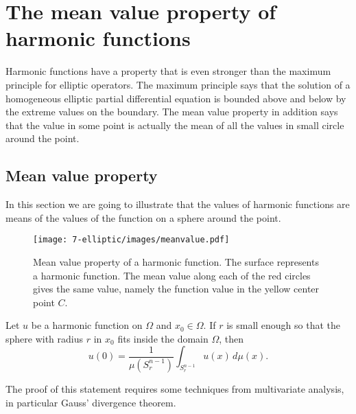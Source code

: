 %
%
%
\section{The mean value property of harmonic functions}
Harmonic functions have a property that is even stronger than
the maximum principle for elliptic operators.
The maximum principle says that the solution of a homogeneous elliptic
partial differential equation is bounded above and below by the
extreme values on the boundary.
The mean value property in addition says that the value in some
point is actually the mean of all the values in small circle
around the point.

\subsection{Mean value property}
In this section we are going to illustrate that the values of harmonic
functions are means of the values of the function on a sphere around 
the point.
\begin{figure}
\centering
\texttt{[image: 7-elliptic/images/meanvalue.pdf]}
\caption{Mean value property of a harmonic function.
The surface represents a harmonic function. 
The mean value along each of the red circles gives the same value,
namely the function value in the yellow center point $C$.
\label{elliptic:meanvalue:image}}
\end{figure}

\begin{satz}
Let $u$ be a harmonic function on $\Omega$ and $x_0\in\Omega$.
If $r$ is small enough so that the sphere with radius $r$ in $x_0$
fits inside the domain $\Omega$,
then
\[
u(0)=\frac1{\mu(S^{n-1}_r)}\int_{S^{n-1}_r}u(x)\,d\mu(x).
\]
\end{satz}

The proof of this statement requires some techniques from multivariate
analysis, in particular Gauss' divergence theorem.

